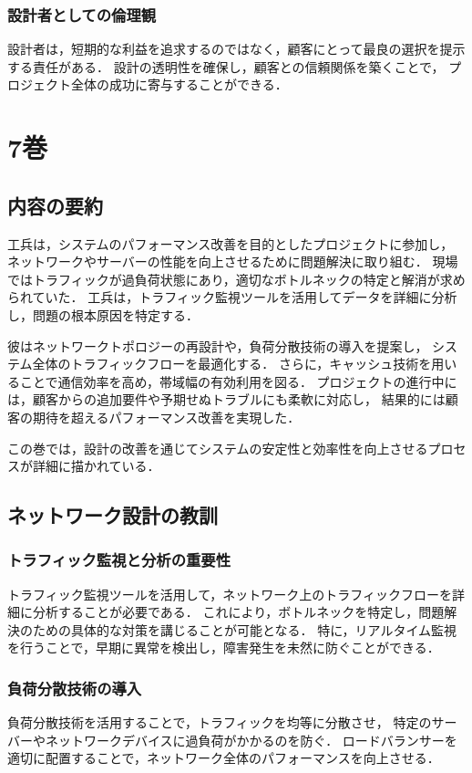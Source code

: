 \documentclass[titlepage,a4paper]{jsarticle}
\begin{document}
\subsubsection{設計者としての倫理観}
設計者は，短期的な利益を追求するのではなく，顧客にとって最良の選択を提示する責任がある．
設計の透明性を確保し，顧客との信頼関係を築くことで，
プロジェクト全体の成功に寄与することができる．
\newpage
\newpage
\newpage
\section{7巻}
\subsection{内容の要約}
工兵は，システムのパフォーマンス改善を目的としたプロジェクトに参加し，
ネットワークやサーバーの性能を向上させるために問題解決に取り組む．
現場ではトラフィックが過負荷状態にあり，適切なボトルネックの特定と解消が求められていた．
工兵は，トラフィック監視ツールを活用してデータを詳細に分析し，問題の根本原因を特定する．

彼はネットワークトポロジーの再設計や，負荷分散技術の導入を提案し，
システム全体のトラフィックフローを最適化する．
さらに，キャッシュ技術を用いることで通信効率を高め，帯域幅の有効利用を図る．
プロジェクトの進行中には，顧客からの追加要件や予期せぬトラブルにも柔軟に対応し，
結果的には顧客の期待を超えるパフォーマンス改善を実現した．

この巻では，設計の改善を通じてシステムの安定性と効率性を向上させるプロセスが詳細に描かれている．

\subsection{ネットワーク設計の教訓}
\subsubsection{トラフィック監視と分析の重要性}
トラフィック監視ツールを活用して，ネットワーク上のトラフィックフローを詳細に分析することが必要である．
これにより，ボトルネックを特定し，問題解決のための具体的な対策を講じることが可能となる．
特に，リアルタイム監視を行うことで，早期に異常を検出し，障害発生を未然に防ぐことができる．

\subsubsection{負荷分散技術の導入}
負荷分散技術を活用することで，トラフィックを均等に分散させ，
特定のサーバーやネットワークデバイスに過負荷がかかるのを防ぐ．
ロードバランサーを適切に配置することで，ネットワーク全体のパフォーマンスを向上させる．
\end{document}
